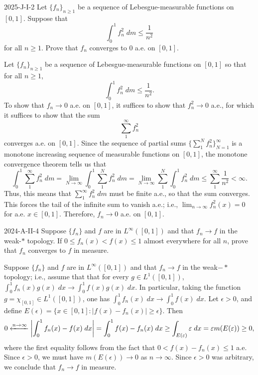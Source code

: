 \documentclass{article}
\begin{document}
	\begin{prb}{2025-J-I-2}
		Let $\{f_n\}_{n \geq 1}$ be a sequence of Lebesgue-measurable functions on $[0,1]$. Suppose that 
		\begin{equation*}
			\int_0^1f_n^2\;dm \leq \frac{1}{n^2}
		\end{equation*}
		for all $n \geq 1$. Prove that $f_n$ converges to 0 a.e. on $[0,1]$. 
	\end{prb}
	Let $\{f_{n}\}_{n \geq 1}$ be a sequence of Lebesgue-measurable functions on $[0,1]$ so that for all $n \geq 1$, 
	\begin{equation*}
		\int_0^1f_n^2\;dm \leq \frac{1}{n^2}. 
	\end{equation*}
	To show that $f_n \to 0$ a.e. on $[0,1]$, it suffices to show that $f_n^2 \to 0$ a.e., for which it suffices to show that the sum 
	\begin{equation*}
		\sum_{1}^{\infty}f_n^2
	\end{equation*}
	converges a.e. on $[0,1]$. Since the sequence of partial sums $\{\sum_1^Nf_n^2\}_{N = 1}^{\infty}$ is a monotone increasing sequence of measurable functions on $[0,1]$, the monotone convergence theorem tells us that 
	\begin{equation*}
		\int_{0}^{1}\sum_{1}^{\infty}f_n^2\;dm = \lim_{N \to \infty}\int_{0}^{1}\sum_{1}^{N}f_n^2\;dm = \lim_{N \to \infty}\sum_{1}^{N}\int_{0}^{1}f_n^2\;dm \leq \sum_1^\infty\frac{1}{n^2} < \infty. 
	\end{equation*}
	Thus, this means that $\sum_1^\infty f_n^2\;dm$ must be finite a.e., so that the sum converges. This forces the tail of the infinite sum to vanish a.e.; i.e., $\lim_{n \to \infty}f_n^2(x) = 0$ for a.e. $x \in [0,1]$. Therefore, $f_n \to 0$ a.e. on  $[0,1]$.
	
	\begin{prb}{2024-A-II-4}
		Suppose $\{f_n\}$ and $f$ are in $L^\infty([0,1])$ and that $f_n \to f$ in the weak-$\ast$ topology. If $0 \leq f_n(x) < f(x) \leq 1$ almost everywhere for all $n$, prove that $f_n$ converges to $f$ in measure. 
	\end{prb}
	Suppose $\{f_n\}$ and $f$ are in $L^\infty([0,1])$ and that $f_n \to f$ in the weak$-\ast$ topology; i.e., assume that that for every $g \in L^1([0,1])$, $\int_{0}^{1}f_n(x)g(x)\;dx \to \int_{0}^{1}f(x)g(x)\;dx$. In particular, taking the function $g = \chi_{[0,1]} \in L^1([0,1])$, one has $\int_{0}^{1}f_n(x)\;dx \to \int_{0}^{1}f(x)\;dx$. Let $\epsilon > 0$, and define $E(\epsilon) = \{x \in [0,1]: |f(x) - f_n(x)|\geq \epsilon\}$. Then 
	\begin{equation*}
		0 \xleftarrow{n \to \infty} \left| \int_{0}^{1}f_{n}(x) - f(x)\;dx \right| = \int_{0}^{1}f(x)- f_{n}(x)\;dx \geq \int_{E(\varepsilon)}\varepsilon\;dx = \varepsilon m(E(\varepsilon)) \geq 0, 
	\end{equation*}
	where the first equality follows from the fact that $0 < f(x) - f_n(x) \leq 1$ a.e. Since $\epsilon > 0$, we must have $m(E(\epsilon)) \to 0$ as $n \to \infty$. Since $\epsilon > 0$ was arbitrary, we conclude that $f_n \to f$ in measure. 
	
\end{document}
